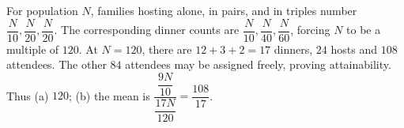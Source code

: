 For population $N$, families hosting alone, in pairs, and in triples number $\dfrac{N}{10},\dfrac{N}{20},\dfrac{N}{20}$. The corresponding dinner counts are $\dfrac{N}{10},\dfrac{N}{40},\dfrac{N}{60}$, forcing $N$ to be a multiple of $120$. At $N=120$, there are $12+3+2=17$ dinners, $24$ hosts and $108$ attendees. The other $84$ attendees may be assigned freely, proving attainability. Thus (a) $\boxed{120}$; (b) the mean is $\dfrac{\dfrac{9N}{10}}{\dfrac{17N}{120}}=\boxed{\dfrac{108}{17}}$.
